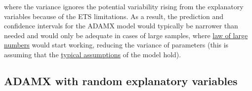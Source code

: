 \documentclass[
]{book}
\theoremstyle{definition}
\theoremstyle{definition}
\theoremstyle{definition}
\theoremstyle{definition}
\theoremstyle{remark}
\begin{document}
where the variance ignores the potential variability rising from the explanatory variables because of the ETS limitations. As a result, the prediction and confidence intervals for the ADAMX model would typically be narrower than needed and would only be adequate in cases of large samples, where \protect\hyperlink{LLNandCLT}{law of large numbers} would start working, reducing the variance of parameters (this is assuming that the \protect\hyperlink{assumptions}{typical assumptions} of the model hold).

\hypertarget{ADAMXConventionalConditionalMomentsRandom}{%
\subsection{ADAMX with random explanatory variables}\label{ADAMXConventionalConditionalMomentsRandom}}
\end{document}
